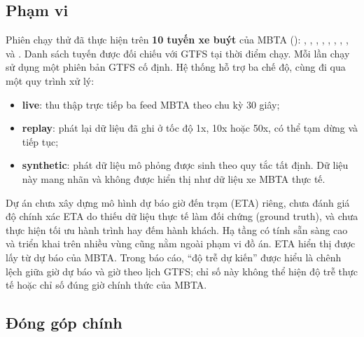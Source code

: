 \subsection{Phạm vi}

Phiên chạy thử đã thực hiện trên \textbf{10 tuyến xe buýt} của MBTA (): , , , , , , , ,  và . Danh sách tuyến được đối chiếu với GTFS tại thời điểm chạy. Mỗi lần chạy sử dụng một phiên bản GTFS cố định. Hệ thống hỗ trợ ba chế độ, cùng đi qua một quy trình xử lý:
\begin{itemize}
    \item \textbf{live}: thu thập trực tiếp ba feed MBTA theo chu kỳ 30 giây;
    \item \textbf{replay}: phát lại dữ liệu đã ghi ở tốc độ 1x, 10x hoặc 50x, có thể tạm dừng và tiếp tục;
    \item \textbf{synthetic}: phát dữ liệu mô phỏng được sinh theo quy tắc tất định. Dữ liệu này mang nhãn  và không được hiển thị như dữ liệu xe MBTA thực tế.
\end{itemize}

Dự án chưa xây dựng mô hình dự báo giờ đến trạm (ETA) riêng, chưa đánh giá độ chính xác ETA do thiếu dữ liệu thực tế làm đối chứng (ground truth), và chưa thực hiện tối ưu hành trình hay đếm hành khách. Hạ tầng có tính sẵn sàng cao và triển khai trên nhiều vùng cũng nằm ngoài phạm vi đồ án. ETA hiển thị được lấy từ dự báo của MBTA. Trong báo cáo, ``độ trễ dự kiến'' được hiểu là chênh lệch giữa giờ dự báo và giờ theo lịch GTFS; chỉ số này không thể hiện độ trễ thực tế hoặc chỉ số đúng giờ chính thức của MBTA.

\subsection{Đóng góp chính}

